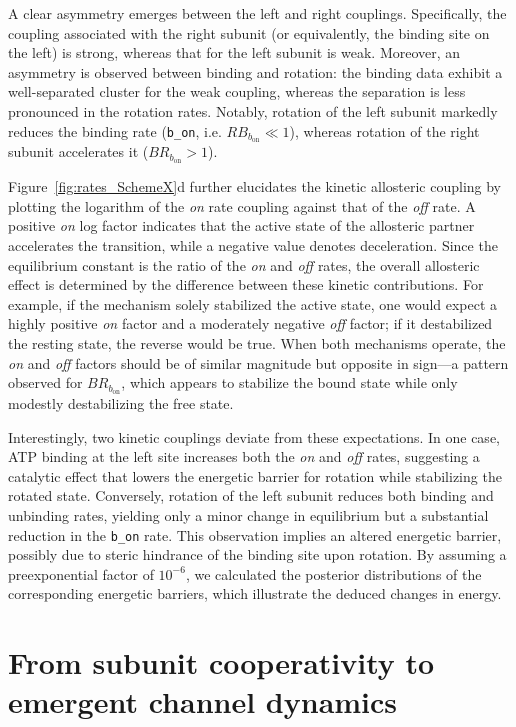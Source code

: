 \documentclass[pdflatex,sn-nature]{sn-jnl}%
\theoremstyle{thmstyleone}%
\theoremstyle{thmstyletwo}%
\theoremstyle{thmstylethree}%
\begin{document}
A clear asymmetry emerges between the left and right couplings. Specifically, the coupling associated with the right subunit (or equivalently, the binding site on the left) is strong, whereas that for the left subunit is weak. Moreover, an asymmetry is observed between binding and rotation: the binding data exhibit a well-separated cluster for the weak coupling, whereas the separation is less pronounced in the rotation rates. Notably, rotation of the left subunit markedly reduces the binding rate (\texttt{b\_on}, i.e. $RB_{b_{\text{on}}} \ll 1$), whereas rotation of the right subunit accelerates it ($BR_{b_{\text{on}}} > 1$).

Figure~\ref{fig:rates_SchemeX}d further elucidates the kinetic allosteric coupling by plotting the logarithm of the \textit{on} rate coupling against that of the \textit{off} rate. A positive \textit{on} log factor indicates that the active state of the allosteric partner accelerates the transition, while a negative value denotes deceleration. Since the equilibrium constant is the ratio of the \textit{on} and \textit{off} rates, the overall allosteric effect is determined by the difference between these kinetic contributions. For example, if the mechanism solely stabilized the active state, one would expect a highly positive \textit{on} factor and a moderately negative \textit{off} factor; if it destabilized the resting state, the reverse would be true. When both mechanisms operate, the \textit{on} and \textit{off} factors should be of similar magnitude but opposite in sign—a pattern observed for $BR_{b_{\text{on}}}$, which appears to stabilize the bound state while only modestly destabilizing the free state.

Interestingly, two kinetic couplings deviate from these expectations. In one case, ATP binding at the left site increases both the \textit{on} and \textit{off} rates, suggesting a catalytic effect that lowers the energetic barrier for rotation while stabilizing the rotated state. Conversely, rotation of the left subunit reduces both binding and unbinding rates, yielding only a minor change in equilibrium but a substantial reduction in the \texttt{b\_on} rate. This observation implies an altered energetic barrier, possibly due to steric hindrance of the binding site upon rotation. By assuming a preexponential factor of $10^{-6}$, we calculated the posterior distributions of the corresponding energetic barriers, which illustrate the deduced changes in energy.

  

\section{From subunit cooperativity to emergent channel dynamics}
\label{sec:collective}
\end{document}
